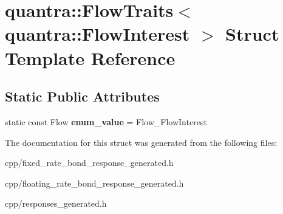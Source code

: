 \hypertarget{structquantra_1_1FlowTraits_3_01quantra_1_1FlowInterest_01_4}{}\section{quantra\+:\+:Flow\+Traits$<$ quantra\+:\+:Flow\+Interest $>$ Struct Template Reference}
\label{structquantra_1_1FlowTraits_3_01quantra_1_1FlowInterest_01_4}
\subsection*{Static Public Attributes}
\begin{DoxyCompactItemize}
\item 
\mbox{\label{structquantra_1_1FlowTraits_3_01quantra_1_1FlowInterest_01_4_afbba1e547317e7795362a1d7adcf60ef}} 
static const Flow {\bfseries enum\+\_\+value} = Flow\+\_\+\+Flow\+Interest
\end{DoxyCompactItemize}


The documentation for this struct was generated from the following files\+:\begin{DoxyCompactItemize}
\item 
cpp/fixed\+\_\+rate\+\_\+bond\+\_\+response\+\_\+generated.\+h\item 
cpp/floating\+\_\+rate\+\_\+bond\+\_\+response\+\_\+generated.\+h\item 
cpp/responses\+\_\+generated.\+h\end{DoxyCompactItemize}
